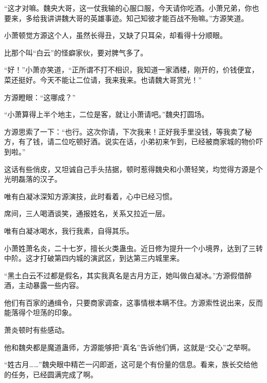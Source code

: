 \begin{this_body}
“这才对嘛。魏央大哥，这一仗我输的心服口服，今天请你吃酒。小萧兄弟，你也要来，多给我讲讲魏大哥的英雄事迹。知己知彼才能百战不殆嘛。”方源笑道。

小萧顿觉方源这个人，虽然长得丑，又缺了只耳朵，却看得十分顺眼。

比那个叫“白云”的怪癖家伙，要对脾气多了。

“好！”小萧亦笑道，“正所谓不打不相识，我知道一家酒楼，刚开的，价钱便宜，菜还挺好。今天不能让二位请，我来我来。也请魏大哥赏光！”

方源瞪眼：“这哪成？”

“小萧算得上半个地主，二位是客，就让小萧请吧。”魏央打圆场。

方源思索了一下：“也行。这次你请，下次我来！正好我手里没钱，等我卖了秘方，有了钱，请二位吃顿好酒。说实在话，小弟初来乍到，已经被商家城的物价吓到啦。”

这话有些俏皮，又坦诚自己手头拮据，顿时惹得魏央和小萧轻笑，均觉得方源是个光明磊落的汉子。

唯有白凝冰深知方源演技，此时看着，心中已经习惯。

席间，三人喝酒谈笑，通报姓名，关系又拉近一层。

唯有白凝冰喝水，我行我素，自得其乐。

小萧姓萧名炎，二十七岁，擅长火类蛊虫。近日修为提升一个小境界，达到了三转中阶。这才打破第四内城的演武区，到达第三内城里来。

“黑土白云不过都是假名，其实我真名是古月方正，她叫做白凝冰。”方源假借醉酒，主动暴露一些内容。

他们有百家的通缉令，只要商家调查，这事情根本瞒不住。方源索性说出来，反而能落得个坦荡的印象。

萧炎顿时有些感动。

他和魏央都是魔道蛊师，方源能够把“真名”告诉他们俩，这就是“交心”之举啊。

“姓古月……”魏央眼中精芒一闪即逝，这可是个有份量的信息。看来，族长交给他的任务，已经圆满完成了啊。

\end{this_body}

